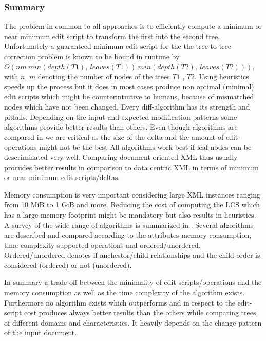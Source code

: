 \subsubsection{Summary}
The problem in common to all approaches is to efficiently compute a minimum or near minimum edit script to transform the first into the second tree. Unfortunately a guaranteed minimum edit script for the the tree-to-tree correction problem is known to be bound in runtime by \\$O(nm\ min(depth(T1),\ leaves(T1))\ min(depth(T2),\ leaves(T2)))$, with $n$, $m$ denoting the number of nodes of the trees $T1$ , $T2$. Using heuristics speeds up the process but it does in most cases produce non optimal (minimal) edit scripts which might be counterintuitive to humans, because of mismatched nodes which have not been changed. Every diff-algorithm has its strength and pitfalls. Depending on the input and expected modification patterns some algorithms provide better results than others. Even though algorithms are compared in \cite{} we are critical as the size of the delta and the amount of edit-operations might not be the best  All algorithms work best if leaf nodes can be descriminated very well. Comparing document oriented XML thus usually procudes better results in comparison to data centric XML in terms of minimum or near minimum edit-scripts/deltas.

Memory consumption is very important considering large XML instances ranging from 10 MiB to 1 GiB and more. Reducing the cost of computing the LCS which has a large memory footprint might be mandatory but also results in heuristics. A survey of the wide range of algorithms is summarized in \cite{cobena2002comparative}. Several algorithms are described and compared according to the attributes memory consumption, time complexity supported operations and ordered/unordered. Ordered/unordered denotes if anchestor/child relationships and the child order is considered (ordered) or not (unordered). 

In summary a trade-off between the minimality of edit scripts/operations and the memory consumption as well as the time complexity of the algorithm exists. Furthermore no algorithm exists which outperforms and in respect to the edit-script cost produces always better results than the others while comparing trees of different domains and characteristics. It heavily depends on the change pattern of the input document.

